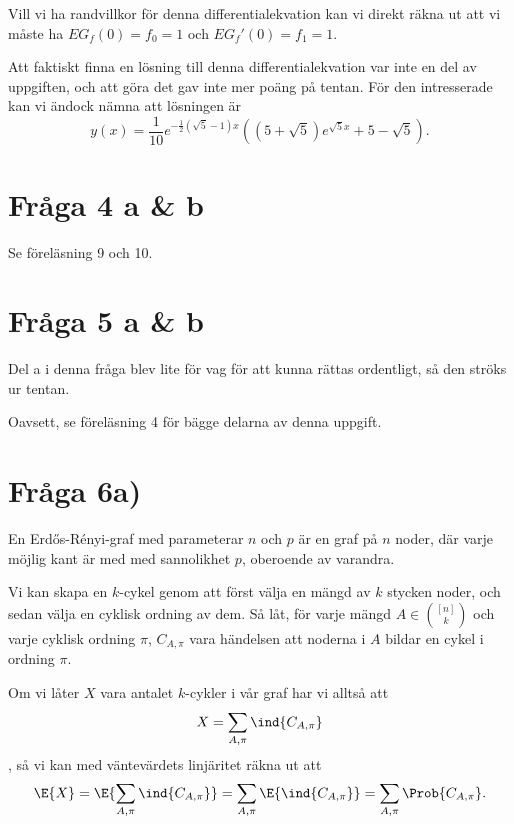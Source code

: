 \documentclass[nobib]{tufte-handout}
\begin{document}
Vill vi ha randvillkor för denna differentialekvation kan vi direkt räkna ut att vi måste ha $EG_f(0) = f_0 = 1$ och $EG_f'(0) = f_1 = 1$.

Att faktiskt finna en lösning till denna differentialekvation var inte en del av uppgiften, och att göra det gav inte mer poäng på tentan. För den intresserade kan vi ändock nämna att lösningen är
$$y(x) = \frac{1}{10} e^{-\frac{1}{2} (\sqrt{5} - 1) x} \left((5 + \sqrt{5}) e^{\sqrt{5} x} + 5 - \sqrt{5}\right).$$

\section{Fråga 4 a \& b}

Se föreläsning 9 och 10.

\section{Fråga 5 a \& b}

Del a i denna fråga blev lite för vag för att kunna rättas ordentligt, så den ströks ur tentan.

Oavsett, se föreläsning 4 för bägge delarna av denna uppgift.

\section{Fråga 6a)}

En Erd\H{o}s-Rényi-graf med parameterar $n$ och $p$ är en graf på $n$ noder, där varje möjlig kant är med med sannolikhet $p$, oberoende av varandra.

Vi kan skapa en $k$-cykel genom att först välja en mängd av $k$ stycken noder, och sedan välja en cyklisk ordning av dem. Så låt, för varje mängd $A \in {[n] \choose k}$ och varje cyklisk ordning $\pi$, $C_{A,\pi}$ vara händelsen att noderna i $A$ bildar en cykel i ordning $\pi$.

Om vi låter $X$ vara antalet $k$-cykler i vår graf har vi alltså att
$$X = \sum_{A, \pi} \ind{C_{A,\pi}}$$,
så vi kan med väntevärdets linjäritet räkna ut att
$$\E{X} = \E{\sum_{A, \pi} \ind{C_{A,\pi}}} = \sum_{A, \pi} \E{\ind{C_{A,\pi}}} = \sum_{A, \pi} \Prob{C_{A,\pi}}.$$
\end{document}
